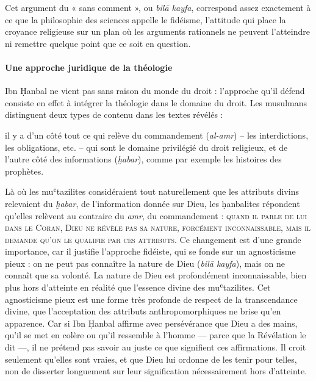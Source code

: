 Cet argument du « sans comment », ou \emph{bilā kayfa}, correspond assez
exactement à ce que la philosophie des sciences appelle le fidéisme,
l'attitude qui place la croyance religieuse sur un plan où les arguments
rationnels ne peuvent l'atteindre ni remettre quelque point que ce soit
en question.

\paragraph{Une approche juridique de la théologie} Ibn Ḥanbal ne vient pas sans raison du monde du droit : l'approche qu'il
défend consiste en effet à intégrer la théologie dans le domaine du
droit. Les musulmans distinguent deux types de contenu dans les textes
révélés : 
\begin{Def}[al-amr]
il y a d'un côté tout ce qui relève du commandement
(\emph{al-amr}) -- les interdictions, les obligations, etc. -- qui sont
le domaine privilégié du droit religieux, et de l'autre côté des
informations (\emph{ḫabar}), comme par exemple les histoires des
prophètes.
\end{Def}  
Là où les muʿtazilites considéraient tout naturellement que
les attributs divins relevaient du \emph{ḫabar}, de l'information donnée
sur Dieu, les ḥanbalites répondent qu'elles relèvent au contraire du
\emph{amr}, du commandement : \textsc{quand il parle de lui dans le Coran, Dieu
ne révèle pas sa nature, forcément inconnaissable, mais il demande qu'on
le qualifie par ces attributs. }Ce changement est d'une grande
importance, car il justifie l'approche fidéiste, qui se fonde sur un
agnosticisme pieux : on ne peut pas connaître la nature de Dieu
(\emph{bilā kayfa}), mais on ne connaît que sa volonté. La nature de
Dieu est profondément inconnaissable, bien plus hors d'atteinte en
réalité que l'essence divine des muʿtazilites. Cet agnosticisme pieux
est une forme très profonde de respect de la transcendance divine, que
l'acceptation des attributs anthropomorphiques ne brise qu'en apparence.
Car si Ibn Ḥanbal affirme avec
persévérance que Dieu a des mains, qu'il se met en colère ou qu'il
ressemble à l'homme --- parce que la Révélation le dit ---, il ne
prétend pas savoir au juste ce que signifient ces affirmations. Il croit
seulement qu'elles sont vraies, et que Dieu lui ordonne de les tenir
pour telles, non de disserter longuement sur leur signification
nécessairement hors d'atteinte.


